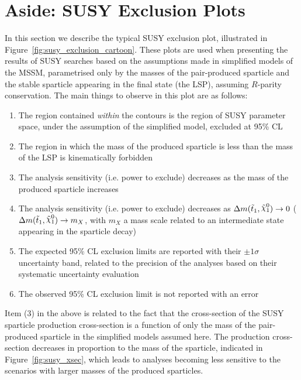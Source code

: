 \FloatBarrier
\section{Aside: SUSY Exclusion Plots}
\label{sec:susy_exclusion_plots}

In this section we describe the typical SUSY exclusion plot, illustrated in Figure~\ref{fig:susy_exclusion_cartoon}.
These plots are used when presenting the results of SUSY searches based on the assumptions
made in simplified models of the MSSM, parametrised only by the masses of the
pair-produced sparticle and the stable sparticle appearing in the final state (the LSP), assuming $R$-parity
conservation. The main things to observe in this plot are as follows:

\begin{enumerate}
    \item The region contained \textit{within} the contours is the region of SUSY parameter space,
        under the assumption of the simplified model, excluded at 95\% CL
    \item The region in which the mass of the produced
        sparticle is less than the mass of the LSP is kinematically forbidden
    \item The analysis sensitivity (i.e. power to exclude) decreases as the mass of the produced sparticle increases
    \item The analysis sensitivity (i.e. power to exclude) decreases as $\sdiff \rightarrow 0$ ($\sdiff \rightarrow m_X$,
        with $m_X$ a mass scale related to an intermediate state appearing in the sparticle decay)
    \item The expected 95\% CL exclusion limits are reported with their $\pm 1 \sigma$ uncertainty band,
        related to the precision of the analyses based on their systematic uncertainty evaluation
    \item The observed 95\% CL exclusion limit is not reported with an error
\end{enumerate}

Item (3) in the above is related to the fact that the cross-section of the SUSY sparticle production cross-section
is a function of only the mass of the pair-produced sparticle in the simplified models assumed here.
The production cross-section decreases in proportion to the mass of the sparticle, indicated in Figure~\ref{fig:susy_xsec},
which leads to analyses becoming less sensitive to the scenarios with larger masses of the produced sparticles.

